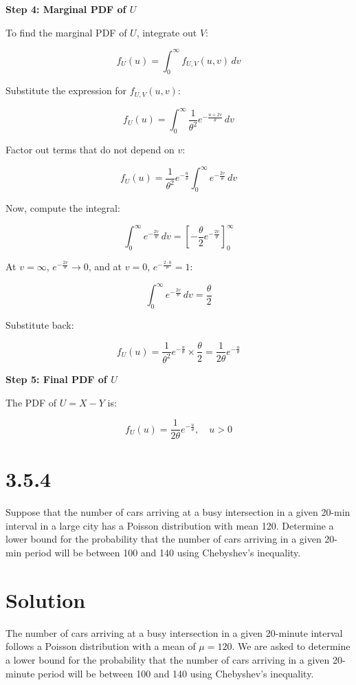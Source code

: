 \documentclass{article}
\begin{document}
\textbf{Step 4: Marginal PDF of \(U\)}

To find the marginal PDF of \(U\), integrate out \(V\):

\[
f_U(u) = \int_{0}^{\infty} f_{U,V}(u, v) \, dv
\]

Substitute the expression for \(f_{U,V}(u, v)\):

\[
f_U(u) = \int_{0}^{\infty} \frac{1}{\theta^2} e^{-\frac{u + 2v}{\theta}} \, dv
\]

Factor out terms that do not depend on \(v\):

\[
f_U(u) = \frac{1}{\theta^2} e^{-\frac{u}{\theta}} \int_{0}^{\infty} e^{-\frac{2v}{\theta}} \, dv
\]

Now, compute the integral:

\[
\int_{0}^{\infty} e^{-\frac{2v}{\theta}} \, dv = \left[ -\frac{\theta}{2} e^{-\frac{2v}{\theta}} \right]_{0}^{\infty}
\]

At \(v = \infty\), \(e^{-\frac{2v}{\theta}} \to 0\), and at \(v = 0\), \(e^{-\frac{2 \cdot 0}{\theta}} = 1\):

\[
\int_{0}^{\infty} e^{-\frac{2v}{\theta}} \, dv = \frac{\theta}{2}
\]

Substitute back:

\[
f_U(u) = \frac{1}{\theta^2} e^{-\frac{u}{\theta}} \times \frac{\theta}{2} = \frac{1}{2\theta} e^{-\frac{u}{\theta}}
\]

\textbf{Step 5: Final PDF of \(U\)}

The PDF of \(U = X - Y\) is:

\[
f_U(u) = \frac{1}{2\theta} e^{-\frac{u}{\theta}}, \quad u > 0
\]


\section*{3.5.4}

Suppose that the number of cars arriving at a busy intersection in a given 20-min interval in a large city has a Poisson distribution with mean 120. Determine a lower bound for the probability that the number of cars arriving in a given 20-min period will be between 100 and 140 using Chebyshev's inequality.

\section*{Solution}

The number of cars arriving at a busy intersection in a given 20-minute interval follows a Poisson distribution with a mean of \(\mu = 120\). We are asked to determine a lower bound for the probability that the number of cars arriving in a given 20-minute period will be between 100 and 140 using Chebyshev's inequality.
\newline
\end{document}
